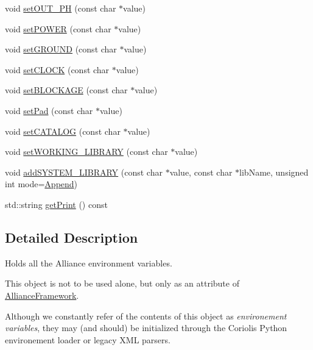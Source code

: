 \begin{DoxyCompactItemize}
\item 
void \hyperlink{classCRL_1_1Environment_a2785f1ae18e4293ce7e9e0bac791e495}{set\+O\+U\+T\+\_\+\+PH} (const char $\ast$value)
\item 
void \hyperlink{classCRL_1_1Environment_ae96c850eadc89d1705b9aa0256f434ea}{set\+P\+O\+W\+ER} (const char $\ast$value)
\item 
void \hyperlink{classCRL_1_1Environment_ac956b6814f89975563a3667945599fb2}{set\+G\+R\+O\+U\+ND} (const char $\ast$value)
\item 
void \hyperlink{classCRL_1_1Environment_a7ddc44d7f27745179c397445bce35c58}{set\+C\+L\+O\+CK} (const char $\ast$value)
\item 
void \hyperlink{classCRL_1_1Environment_af18cbbcdfb458b69dbb6de0dbb564a3a}{set\+B\+L\+O\+C\+K\+A\+GE} (const char $\ast$value)
\item 
void \hyperlink{classCRL_1_1Environment_a06c179d70d3065f0bfe398a02e4c6359}{set\+Pad} (const char $\ast$value)
\item 
void \hyperlink{classCRL_1_1Environment_a02b727f207875cebefbb59842c1efe70}{set\+C\+A\+T\+A\+L\+OG} (const char $\ast$value)
\item 
void \hyperlink{classCRL_1_1Environment_a315f5a14de9dc354cf81728adb29a8c6}{set\+W\+O\+R\+K\+I\+N\+G\+\_\+\+L\+I\+B\+R\+A\+RY} (const char $\ast$value)
\item 
void \hyperlink{classCRL_1_1Environment_a7c3bff1fa3f9a080461950db36df4416}{add\+S\+Y\+S\+T\+E\+M\+\_\+\+L\+I\+B\+R\+A\+RY} (const char $\ast$value, const char $\ast$lib\+Name, unsigned int mode=\hyperlink{classCRL_1_1Environment_ac5692c2f5d20e892573a3d46de222aeba69ce578d2eeb6a8de507920ccf673b8d}{Append})
\item 
std\+::string \hyperlink{classCRL_1_1Environment_a9d55dc4dc591a1d3404af53b72ab7f8e}{get\+Print} () const
\end{DoxyCompactItemize}


\subsection{Detailed Description}
Holds all the Alliance environment variables. 

This object is not to be used alone, but only as an attribute of \hyperlink{classCRL_1_1AllianceFramework}{Alliance\+Framework}.

Although we constantly refer of the contents of this object as {\itshape environement variables}, they may (and should) be initialized through the Coriolis Python environement loader or legacy X\+ML parsers. 

